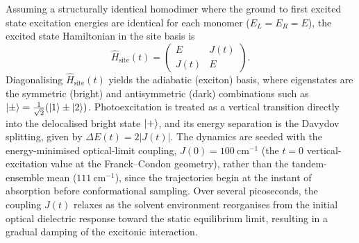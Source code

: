 \documentclass[journal=jpcbfk, manuscript=article, layout=twocolumn, doi=true]{achemso}
\begin{document}
Assuming a structurally identical homodimer where the ground to first excited state excitation energies are identical for each monomer ($E_L = E_R = E$), the excited state Hamiltonian in the site basis is
\begin{equation}
    \hat H_{\text{site}}(t)=\begin{pmatrix} E & J(t) \\ J(t) & E \end{pmatrix}.
\end{equation}
Diagonalising $\hat H_{\text{site}}(t)$ yields the adiabatic (exciton) basis, where eigenstates are the symmetric (bright) and antisymmetric (dark) combinations such as $\ket{\pm} = \frac{1}{\sqrt{2}}(\ket{1} \pm \ket{2})$. Photoexcitation is treated as a vertical transition directly into the delocalised bright state $\ket{+}$, and its energy separation is the Davydov splitting, given by $\Delta E(t) = 2|J(t)|$. The dynamics are seeded with the energy-minimised optical-limit coupling, $J(0) = 100~\mathrm{cm^{-1}}$ (the $t=0$ vertical-excitation value at the Franck--Condon geometry), rather than the tandem-ensemble mean ($111~\mathrm{cm^{-1}}$), since the trajectories begin at the instant of absorption before conformational sampling. Over several picoseconds, the coupling $J(t)$ relaxes as the solvent environment reorganises from the initial optical dielectric response toward the static equilibrium limit, resulting in a gradual damping of the excitonic interaction.
\end{document}
